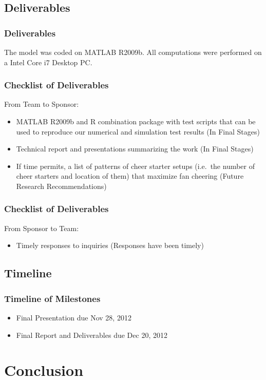 \documentclass[compress,handout,10pt]{beamer}
\let\olditem\item
\renewcommand{\item}{\setlength{\itemsep}{0.5\baselineskip}\olditem}
\begin{document}
\subsection{Deliverables}

\begin{frame}
	\frametitle{Deliverables}
	The model was coded on MATLAB R2009b. All computations were performed on a Intel Core i7 Desktop PC. \newline
	\end{frame}

\begin{frame}
	\frametitle{Checklist of Deliverables}
	From Team to Sponsor:
	\begin {itemize}
	\item MATLAB R2009b and R combination package with test scripts that can be used to reproduce our numerical and simulation test results (In Final Stages)
		\item Technical report and presentations summarizing the work (In Final Stages)
	\item If time permits, a list of patterns of cheer starter setups (i.e.~the number of cheer starters and location of them) that maximize fan cheering (Future Research Recommendations)
	\end{itemize}
\end{frame}

\begin{frame}
	\frametitle{Checklist of Deliverables}
	From Sponsor to Team:
	\begin{itemize}
		\item Timely responses to inquiries (Responses have been timely)
	\end{itemize}
\end{frame}

\subsection{Timeline}

\begin{frame}
	\frametitle{Timeline of Milestones}
	\begin{itemize}
    \item Final Presentation due Nov 28, 2012
    \item Final Report and Deliverables due Dec 20, 2012
	\end{itemize}
\end{frame}

\section{Conclusion}
\end{document}
